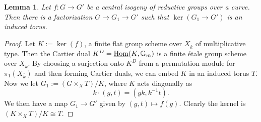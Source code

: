 \documentclass[reqno]{amsart}
\numberwithin{equation}{subsection}
\newtheorem{lemma}[subsubsection]{Lemma}
\theoremstyle{definition}
\def\GG{\mathbb{G}}
\newcommand\Hom{\textup{Hom}}
\newcommand{\ul}[1]{\underline{#1}}
\newcommand{\ol}[1]{\overline{#1}}
\newcommand{\co}{\colon}
\begin{document}
\begin{lemma}\label{lem:factorization}
Let $f \co G \rightarrow G'$ be a central isogeny of reductive groups over a curve. Then there is a factorization $G \rightarrow G_1 \rightarrow G'$ such that $\ker(G_1 \rightarrow G')$ is an induced torus.
\end{lemma}


\begin{proof}
Let $K := \ker(f)$, a finite flat group scheme over $X_{\ol k}$ of multiplicative type. Then the Cartier dual $K^D = \ul{\Hom}(K, \GG_m)$ is a finite \'etale group scheme over $X_{\ol k}$. By choosing a surjection onto $K^D$ from a permutation module for $\pi_1(X_{\ol k})$ and then forming Cartier duals, we can embed $K$ in an induced torus $T$. Now we let $G_1 := (G \times_X T)/K$, where $K$ acts diagonally as 
\[
k \cdot (g,t) = (gk, k^{-1} t). 
\]
We then have a map $G_1 \rightarrow G'$ given by $(g, t) \mapsto f(g)$. Clearly the kernel is $(K \times_X T)/K \cong T$. 
\end{proof}
\end{document}

